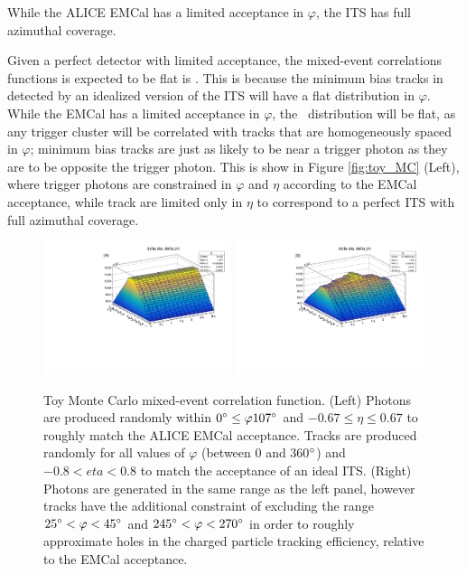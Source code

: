While the ALICE EMCal has a limited acceptance in $\varphi$, the ITS has full azimuthal coverage. 

Given a perfect detector with limited acceptance, the mixed-event correlations functions is expected to be flat is \deltaeta. This is because the minimum bias tracks in detected by an idealized version of the ITS will have a flat distribution in $\varphi$. While the EMCal has a limited acceptance in $\varphi$, the \deltaphi~distribution will be flat, as any trigger cluster will be correlated with tracks that are homogeneously spaced in $\varphi$; minimum bias tracks are just as likely to be near a trigger photon as they are to be opposite the trigger photon. This is show in Figure \ref{fig:toy_MC} (Left), where trigger photons are constrained in $\varphi$ and $\eta$ according to the EMCal acceptance, while track are limited only in $\eta$ to correspond to a perfect ITS with full azimuthal coverage.  

\begin{figure}[htpb]
	\includegraphics[width=0.49\textwidth]{Data_Analysis/EventMixing/toy_MC_no_holes.pdf}
	\includegraphics[width=0.49\textwidth]{Data_Analysis/EventMixing/toy_MC_holes.pdf}
  \caption{Toy Monte Carlo mixed-event correlation function. (Left) Photons are produced randomly within $0\degree \leq \varphi 107\degree$ and $ -0.67 \leq \eta \leq 0.67$ to roughly match the ALICE EMCal acceptance. Tracks are produced randomly for all values of $\varphi$ (between 0 and 360$\degree$) and $-0.8 < eta < 0.8$ to match the acceptance of an ideal ITS. (Right) Photons are generated in the same range as the left panel, however tracks have the additional constraint of excluding the range $ 25\degree< \varphi < 45\degree$ and $ 245\degree < \varphi < 270\degree$ in order to roughly approximate holes in the charged particle tracking efficiency, relative to the EMCal acceptance.} 
	\label{fig:toy}
\end{figure}


